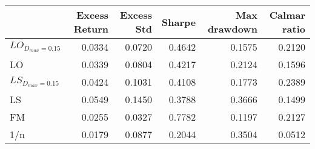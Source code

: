 \begin{tabular}{lrrrrr}
\toprule
{} &  Excess Return &  Excess Std &  Sharpe &  Max drawdown &  Calmar ratio \\
\midrule
$LO_{D_{max}=0.15}$ &         0.0334 &      0.0720 &  0.4642 &        0.1575 &        0.2120 \\
LO                  &         0.0339 &      0.0804 &  0.4217 &        0.2124 &        0.1596 \\
$LS_{D_{max}=0.15}$ &         0.0424 &      0.1031 &  0.4108 &        0.1773 &        0.2389 \\
LS                  &         0.0549 &      0.1450 &  0.3788 &        0.3666 &        0.1499 \\
FM                  &         0.0255 &      0.0327 &  0.7782 &        0.1197 &        0.2127 \\
1/n                 &         0.0179 &      0.0877 &  0.2044 &        0.3504 &        0.0512 \\
\bottomrule
\end{tabular}
